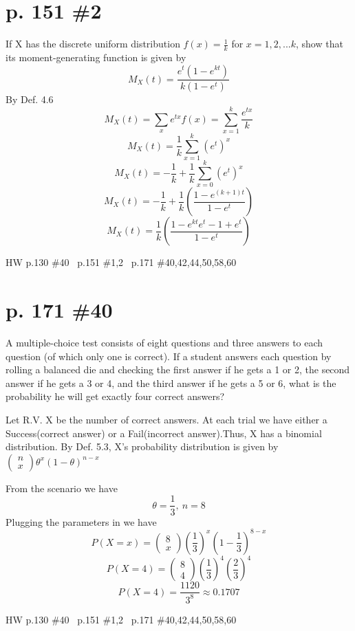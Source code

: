 \documentclass[12pt]{article}
\begin{document}
	\section[20pt]{p. 151 \#2}
	If X has the discrete uniform distribution \(f(x)=\frac{1}{k}\) for \(x=1,2,...k\), show that its moment-generating function is given by
	\newline
	\[M_X(t)=\frac{e^t(1-e^{kt})}{k(1-e^t)}\]
	\newline
	\newline
	By Def. 4.6
	\[M_X(t)=\sum_xe^{tx}f(x)=\sum_{x=1}^k\frac{e^{tx}}{k}\]
	\[M_X(t)=\frac{1}{k}\sum_{x=1}^k(e^t)^x\]
	\[M_X(t)=-\frac{1}{k}+\frac{1}{k}\sum_{x=0}^k(e^t)^x\]
	\[M_X(t)=-\frac{1}{k}+\frac{1}{k}\left(\frac{1-e^{(k+1)t}}{1-e^t}\right)\]
	\[M_X(t)=\frac{1}{k}\left(\frac{1-e^{kt}e^t-1+e^t}{1-e^t}\right)\]
	\newpage
	\maketitle HW p.130 \#40 \ p.151 \#1,2 \ p.171 \#40,42,44,50,58,60
	\section[20pt]{p. 171 \#40}
	A multiple-choice test consists of eight questions and three answers to each question (of which only one is correct). If a student answers each question by rolling a balanced die and checking the first answer if he gets a 1 or 2, the second answer if he gets a 3 or 4, and the third answer if he gets a 5 or 6, what is the probability he will get exactly four correct answers?
	\newline
	\newline
	
	Let R.V. X be the number of correct answers. At each trial we have either a Success(correct answer) or a Fail(incorrect answer).Thus, X has a binomial distribution.\newline
	By Def. 5.3, X's probability distribution is given by \(\left(\begin{array}{ccc}
	n \\ x
	\end{array}\right)\theta^x(1-\theta)^{n-x}\)
	
	From the scenario we have
	\[\theta=\frac{1}{3},\ n=8\]
	Plugging the parameters in we have
	\[P(X=x)=\left(\begin{array}{ccc}
	8 \\ x
	\end{array}\right)\left(\frac{1}{3}\right)^x\left(1-\frac{1}{3}\right)^{8-x}\]
	\[P(X=4)=\left(\begin{array}{ccc}
	8 \\ 4
	\end{array}\right)\left(\frac{1}{3}\right)^4\left(\frac{2}{3}\right)^{4}\]
	\[P(X=4)=\frac{1120}{3^8}\approx0.1707\]
	\newpage
	\maketitle HW p.130 \#40 \ p.151 \#1,2 \ p.171 \#40,42,44,50,58,60
\end{document}
